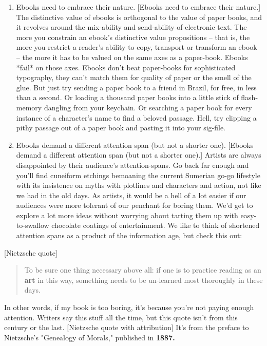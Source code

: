 \begin{enumerate}
\item
  Ebooks need to embrace their nature. [Ebooks need to embrace their
  nature.] The distinctive value of ebooks is orthogonal to the value
  of paper books, and it revolves around the mix-ability and
  send-ability of electronic text. The more you constrain an ebook's
  distinctive value propositions -- that is, the more you restrict a
  reader's ability to copy, transport or transform an ebook -- the
  more it has to be valued on the same axes as a paper-book. Ebooks
  *fail* on those axes. Ebooks don't beat paper-books for
  sophisticated typography, they can't match them for quality of
  paper or the smell of the glue. But just try sending a paper book
  to a friend in Brazil, for free, in less than a second. Or loading
  a thousand paper books into a little stick of flash-memory dangling
  from your keychain. Or searching a paper book for every instance of
  a character's name to find a beloved passage. Hell, try clipping a
  pithy passage out of a paper book and pasting it into your
  sig-file.
\item
  Ebooks demand a different attention span (but not a shorter one).
  [Ebooks demand a different attention span (but not a shorter one).]
  Artists are always disappointed by their audience's
  attention-spans. Go back far enough and you'll find cuneiform
  etchings bemoaning the current Sumerian go-go lifestyle with its
  insistence on myths with plotlines and characters and action, not
  like we had in the old days. As artists, it would be a hell of a
  lot easier if our audiences were more tolerant of our penchant for
  boring them. We'd get to explore a lot more ideas without worrying
  about tarting them up with easy-to-swallow chocolate coatings of
  entertainment. We like to think of shortened attention spans as a
  product of the information age, but check this out:
\end{enumerate}
[Nietzsche quote]

\begin{quote}
To be sure one thing necessary above all: if one is to practice
reading as an \textbf{art} in this way, something needs to be
un-learned most thoroughly in these days.

\end{quote}
In other words, if my book is too boring, it's because you're not
paying enough attention. Writers say this stuff all the time, but
this quote isn't from this century or the last. [Nietzsche quote
with attribution] It's from the preface to Nietzsche's "Genealogy
of Morals," published in \textbf{1887.}

